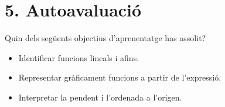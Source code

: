 \documentclass[12pt,a4paper]{article}
\begin{document}
\section*{5. Autoavaluació}
Quin dels següents objectius d'aprenentatge has assolit?
\begin{itemize}[label=$\square$]
    \item Identificar funcions lineals i afins.
    \item Representar gràficament funcions a partir de l'expressió.
    \item Interpretar la pendent i l'ordenada a l'origen.
\end{itemize}
\end{document}
